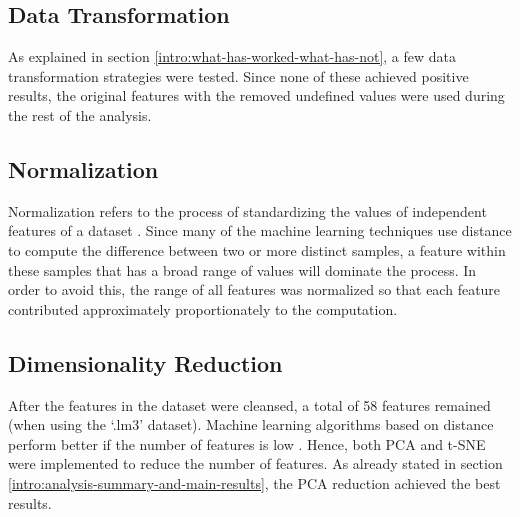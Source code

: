 \subsection{Data Transformation}

As explained in section \ref{intro:what-has-worked-what-has-not}, a few data transformation strategies were tested. Since none of these achieved positive results, the original features with the removed undefined values were used during the rest of the analysis.

\subsection{Normalization}

Normalization refers to the process of standardizing the values of independent features of a dataset \cite{data-mining-intro}. Since many of the machine learning techniques use distance to compute the difference between two or more distinct samples, a feature within these samples that has a broad range of values will dominate the process. In order to avoid this, the range of all features was normalized so that each feature contributed approximately proportionately to the computation.

\subsection{Dimensionality Reduction}

After the features in the dataset were cleansed, a total of 58 features remained (when using the `.lm3' dataset). Machine learning algorithms based on distance perform better if the number of features is low \cite{data-mining-intro}. Hence, both PCA and t-SNE were implemented to reduce the number of features. As already stated in section \ref{intro:analysis-summary-and-main-results}, the PCA reduction achieved the best results.
